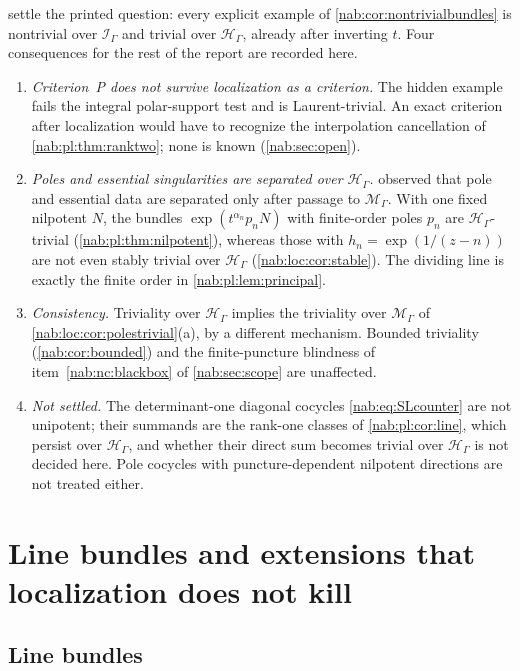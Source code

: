 \documentclass[11pt,letterpaper]{article}
\theoremstyle{definition}
\theoremstyle{remark}
\newcommand{\HH}{\mathscr H_\Gamma}
\newcommand{\II}{\mathscr I_\Gamma}
\newcommand{\MM}{\mathscr M_\Gamma}
\numberwithin{equation}{section}
\begin{document}
 settle the printed question: every
explicit example of \cref{nab:cor:nontrivialbundles} is nontrivial over $\II$
and trivial over $\HH$, already after inverting $t$. Four consequences for the
rest of the report are recorded here.
\begin{enumerate}[label=\textup{(\alph*)}]
\item \emph{Criterion~P does not survive localization as a criterion.} The
hidden example fails the integral polar-support test and is Laurent-trivial.
An exact criterion after localization would have to recognize the
interpolation cancellation of \cref{nab:pl:thm:ranktwo}; none is known
(\cref{nab:sec:open}).
\item \emph{Poles and essential singularities are separated over $\HH$.}
 observed that pole and essential data are
separated only after passage to $\MM$. With one fixed nilpotent $N$, the
bundles $\exp(t^{\alpha_n}p_nN)$ with finite-order poles $p_n$ are
$\HH$-trivial (\cref{nab:pl:thm:nilpotent}), whereas those with $h_n=\exp(1/(z-n))$
are not even stably trivial over $\HH$ (\cref{nab:loc:cor:stable}). The
dividing line is exactly the finite order in \cref{nab:pl:lem:principal}.
\item \emph{Consistency.} Triviality over $\HH$ implies the triviality over
$\MM$ of \cref{nab:loc:cor:polestrivial}(a), by a different mechanism. Bounded
triviality (\cref{nab:cor:bounded}) and the finite-puncture blindness of
item~\ref{nab:nc:blackbox} of \cref{nab:sec:scope} are unaffected.
\item \emph{Not settled.} The determinant-one diagonal cocycles
\eqref{nab:eq:SLcounter} are not unipotent; their summands are the rank-one
classes of \cref{nab:pl:cor:line}, which persist over $\HH$, and whether their
direct sum becomes trivial over $\HH$ is not decided here. Pole cocycles with
puncture-dependent nilpotent directions are not treated either.
\end{enumerate}

\section{Line bundles and extensions that localization does not kill}
\label{nab:pl:sec:persist}

\subsection{Line bundles}
\end{document}
